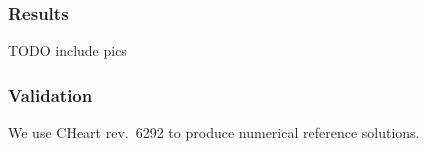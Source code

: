 \subsubsection{Results}
%
%
%


%
TODO include pics
%
%
\subsubsection{Validation}
%
We use CHeart rev.\ 6292 to produce numerical reference solutions.
%
